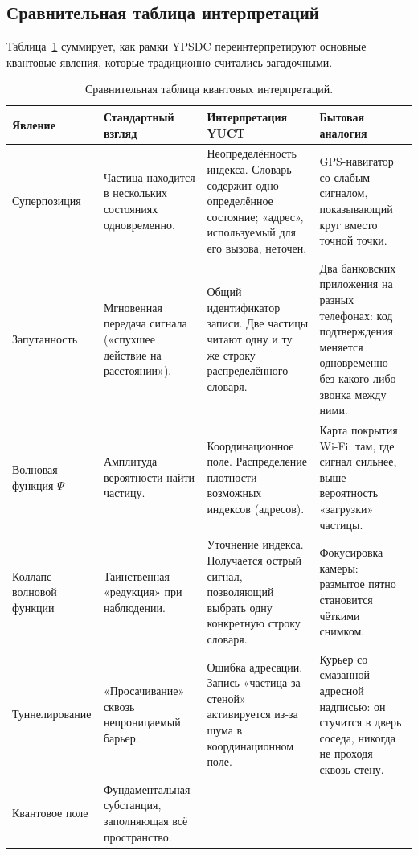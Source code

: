 \documentclass[12pt,a4paper]{article}
\theoremstyle{remark}
\begin{document}
	\subsection{Сравнительная таблица интерпретаций}
	
	Таблица~\ref{tab:quantum-interpretations} суммирует, как рамки YPSDC переинтерпретируют основные квантовые явления, которые традиционно считались загадочными.
	
	\begin{table}[H]
		\centering
		\caption{Сравнительная таблица квантовых интерпретаций.}
		\label{tab:quantum-interpretations}
		\small
		\begin{tabularx}{\textwidth}{p{2.8cm} p{3.0cm} p{4.5cm} p{4.5cm}}
			\toprule
			\textbf{Явление} & \textbf{Стандартный взгляд} & \textbf{Интерпретация YUCT} & \textbf{Бытовая аналогия} \\
			\midrule
			Суперпозиция &
			Частица находится в нескольких состояниях одновременно. &
			Неопределённость индекса. Словарь содержит одно определённое состояние; «адрес», используемый для его вызова, неточен. &
			GPS-навигатор со слабым сигналом, показывающий круг вместо точной точки. \\
			\addlinespace
			Запутанность &
			Мгновенная передача сигнала («спухшее действие на расстоянии»). &
			Общий идентификатор записи. Две частицы читают одну и ту же строку распределённого словаря. &
			Два банковских приложения на разных телефонах: код подтверждения меняется одновременно без какого-либо звонка между ними. \\
			\addlinespace
			Волновая функция \( \Psi \) &
			Амплитуда вероятности найти частицу. &
			Координационное поле. Распределение плотности возможных индексов (адресов). &
			Карта покрытия Wi-Fi: там, где сигнал сильнее, выше вероятность «загрузки» частицы. \\
			\addlinespace
			Коллапс волновой функции &
			Таинственная «редукция» при наблюдении. &
			Уточнение индекса. Получается острый сигнал, позволяющий выбрать одну конкретную строку словаря. &
			Фокусировка камеры: размытое пятно становится чёткими снимком. \\
			\addlinespace
			Туннелирование &
			«Просачивание» сквозь непроницаемый барьер. &
			Ошибка адресации. Запись «частица за стеной» активируется из-за шума в координационном поле. &
			Курьер со смазанной адресной надписью: он стучится в дверь соседа, никогда не проходя сквозь стену. \\
			\addlinespace
			Квантовое поле &
			Фундаментальная субстанция, заполняющая всё пространство. &

\end{tabularx}
\end{table}
\end{document}
